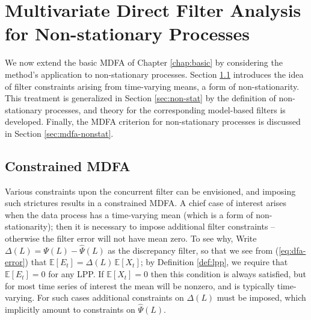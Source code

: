 \documentclass[a4paper]{book}
\def\EE{\mathbb E}
\begin{document}



\chapter{Multivariate Direct Filter Analysis for Non-stationary Processes}
\label{chap:int}

 We now extend the basic MDFA of Chapter \ref{chap:basic}  by considering
 the method's application to  non-stationary processes.  
 Section \ref{sec:constraint} introduces the idea of filter constraints
arising from time-varying means, a form of non-stationarity.
 This treatment is generalized in Section \ref{sec:non-stat}
  by the definition of non-stationary processes, and theory for the corresponding
   model-based filters is developed.  Finally, the MDFA criterion for
    non-stationary processes is discussed in Section \ref{sec:mdfa-nonstat}.
 
   



\section{Constrained MDFA}
\label{sec:constraint}

 Various constraints upon the concurrent filter can be envisioned, 
   and imposing such strictures results in  a constrained MDFA. 
   A chief case of interest arises when the 
    data process has a time-varying mean (which is a form of  non-stationarity);
  then it is necessary to impose additional filter constraints -- otherwise
   the filter error will not have mean zero.    To see why, 
   Write $\Delta (L) = \Psi (L) - \widehat{\Psi} (L)$ as the discrepancy filter,
   so that we see  from (\ref{eq:dfa-error})  
   that $\EE [ E_t ] = \Delta (L) \, \EE [ X_t ]$; 
   by Definition \ref{def:lpp}, we require
 that $\EE [ E_t ] = 0$ for any LPP.  
  If $\EE [ X_t] = 0$ then this condition is always satisfied, but
   for most time series of interest the mean will be nonzero, and is typically
    time-varying.  For such cases additional constraints on $\Delta (L)$ must be imposed,
    which implicitly amount to constraints on $\widehat{\Psi} (L)$.
    
\end{document}
